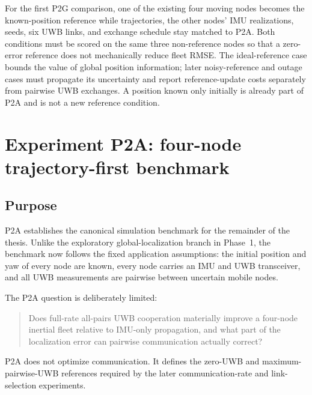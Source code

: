 For the first P2G comparison, one of the existing four moving nodes becomes the known-position reference while trajectories, the other nodes' IMU realizations, seeds, six UWB links, and exchange schedule stay matched to P2A. Both conditions must be scored on the same three non-reference nodes so that a zero-error reference does not mechanically reduce fleet RMSE. The ideal-reference case bounds the value of global position information; later noisy-reference and outage cases must propagate its uncertainty and report reference-update costs separately from pairwise UWB exchanges. A position known only initially is already part of P2A and is not a new reference condition.

\section{Experiment P2A: four-node trajectory-first benchmark}
\subsection{Purpose}
P2A establishes the canonical simulation benchmark for the remainder of the thesis. Unlike the exploratory global-localization branch in Phase~1, the benchmark now follows the fixed application assumptions: the initial position and yaw of every node are known, every node carries an IMU and UWB transceiver, and all UWB measurements are pairwise between uncertain mobile nodes.

The P2A question is deliberately limited:
\begin{quote}
Does full-rate all-pairs UWB cooperation materially improve a four-node inertial fleet relative to IMU-only propagation, and what part of the localization error can pairwise communication actually correct?
\end{quote}
P2A does not optimize communication. It defines the zero-UWB and maximum-pairwise-UWB references required by the later communication-rate and link-selection experiments.

